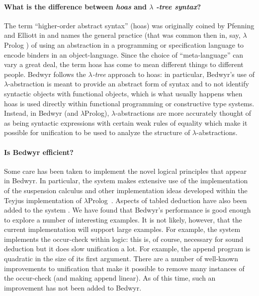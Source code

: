 \documentclass{article}
\newcommand{\lp}{$\lambda$Prolog}
\begin{document}
\paragraph{What is the difference between {\em hoas} and $\lambda${\em
    -tree syntax}?} 
The term ``higher-order abstract syntax'' (hoas) was originally coined
by Pfenning and Elliott in \cite{pfenning88pldi} and names the general
practice (that was common then in, say, $\lambda$Prolog
\cite{miller87slp}) of using an abstraction in a programming or
specification language to encode binders in an object-language.  Since
the choice of ``meta-language'' can vary a great deal, the term hoas
has come to mean different things to different people.  Bedwyr follows
the {\em $\lambda$-tree} approach \cite{miller00cl} to hoas: in
particular, Bedwyr's use of $\lambda$-abstraction is meant to provide
an abstract form of syntax and to not identify syntactic objects with
functional objects, which is what usually happens when hoas is used
directly within functional programming or constructive type systems.
Instead, in Bedwyr (and \lp), $\lambda$-abstractions are more
accurately thought of as being syntactic expressions with certain weak
rules of equality which make it possible for unification to be used to
analyze the structure of $\lambda$-abstractions.  

\paragraph{Is Bedwyr efficient?}
Some care has been taken to implement the novel logical principles
that appear in Bedwyr.  In particular, the system makes extensive use
of the implementation of the suspension calculus \cite{nadathur99jflp}
and other implementation ideas developed within the Teyjus
\cite{nadathur99cade} implementation of \lp\ \cite{nadathur88iclp}.
Aspects of tabled deduction have also been added to the system
\cite{ramakrishna97cav,pientka05cade}.  We have found that Bedwyr's
performance is good enough to explore a number of interesting
examples.  It is not likely, however, that the current implementation
will support large examples.  For example, the system implements the
occur-check within logic: this is, of course, necessary for sound
deduction but it does slow unification a lot.  For example, the append
program is quadratic in the size of its first argument.  There are a
number of well-known improvements to unification that make it possible
to remove many instances of the occur-check (and making append
linear).  As of this time, such an improvement has not been added to
Bedwyr.  
\end{document}
